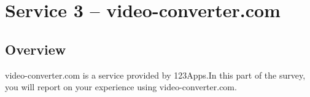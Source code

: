 \section{Service 3 – video-converter.com}
\subsection{Overview}
video-converter.com is a service provided by 123Apps.In this part of the survey, you will report on your experience using video-converter.com.


\clearpage

\clearpage
